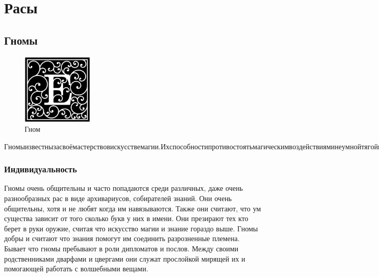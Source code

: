 \documentclass[oneside, twocolumn, final, 12pt] {extreport}
\begin{document}
	
	\chapter{Расы}
	\section{Гномы}
	\begin{figure}
		\includegraphics[width=0.3\textwidth]{E}
		\caption{Гном}
		\label{fig:image}
	\end{figure}
	$Гномы известны за своё мастерство в искусстве магии. Их способности противостоять магическим воздействиям и неумной тягой к знаниям, а также тонкой обработкой камней и металлов, в которой они могут сравниться с эльфами. Гномы создают уникальные вещи или передают знания народам и расам.$
	
	\subsection{Индивидуальность}
	
	Гномы очень общительны и часто попадаются среди различных, даже очень разнообразных рас в виде архивариусов, собирателей знаний. Они очень общительны, хотя и не любят когда им навязываются. Также они считают, что ум существа зависит от того сколько букв у них в имени. Они презирают тех кто берет в руки оружие, считая что искусство магии и знание гораздо выше. Гномы добры и считают что знания помогут им соединить разрозненные племена. Бывает что гномы пребывают в роли дипломатов и послов. Между своими родственниками дварфами и цвергами они служат прослойкой мирящей их и помогающей работать с волшебными вещами.
\end{document}
